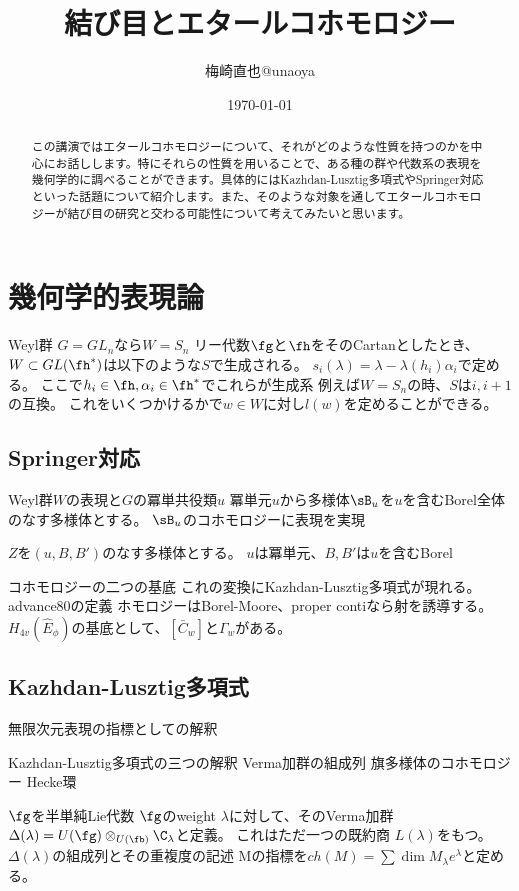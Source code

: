 \documentclass[uplatex]{jsarticle}
\title{結び目とエタールコホモロジー}
\author{梅崎直也@unaoya}
\date{\today}
\begin{document}
\maketitle

\begin{abstract}
この講演ではエタールコホモロジーについて、それがどのような性質を持つのかを中心にお話しします。特にそれらの性質を用いることで、ある種の群や代数系の表現を幾何学的に調べることができます。具体的にはKazhdan-Lusztig多項式やSpringer対応といった話題について紹介します。また、そのような対象を通してエタールコホモロジーが結び目の研究と交わる可能性について考えてみたいと思います。
\end{abstract}

\section{幾何学的表現論}
Weyl群
$G=GL_n$なら$W=S_n$
リー代数$\fg$と$\fh$をそのCartanとしたとき、$W\subset GL(\fh^*)$は以下のような$S$で生成される。
$s_i(\lambda)=\lambda-\lambda(h_i)\alpha_i$で定める。
ここで$h_i\in \fh, \alpha_i\in\fh^*$でこれらが生成系
例えば$W=S_n$の時、$S$は$i,i+1$の互換。
これをいくつかけるかで$w\in W$に対し$l(w)$を定めることができる。

\subsection{Springer対応}
Weyl群$W$の表現と$G$の冪単共役類$u$
冪単元$u$から多様体$\sB_u$を$u$を含むBorel全体のなす多様体とする。
$\sB_u$のコホモロジーに表現を実現

$Z$を$(u,B,B')$のなす多様体とする。
$u$は冪単元、$B, B'$は$u$を含むBorel

コホモロジーの二つの基底
これの変換にKazhdan-Lusztig多項式が現れる。
advance80の定義
ホモロジーはBorel-Moore、proper contiなら射を誘導する。
$H_{4v}(\hat{E}_\phi)$の基底として、$[\bar{C}_w]$と$\Gamma_w$がある。


\subsection{Kazhdan-Lusztig多項式}
無限次元表現の指標としての解釈

Kazhdan-Lusztig多項式の三つの解釈
Verma加群の組成列
旗多様体のコホモロジー
Hecke環

$\fg$を半単純Lie代数
$\fg$のweight $\lambda$に対して、そのVerma加群 $\Delta(\lambda)=U(\fg)\otimes_{U(\fb)}\C_\lambda$と定義。
これはただ一つの既約商 $L(\lambda)$をもつ。
$\Delta(\lambda)$の組成列とその重複度の記述
Mの指標を$ch(M)=\sum\dim M_\lambda e^\lambda$と定める。
\end{document}
